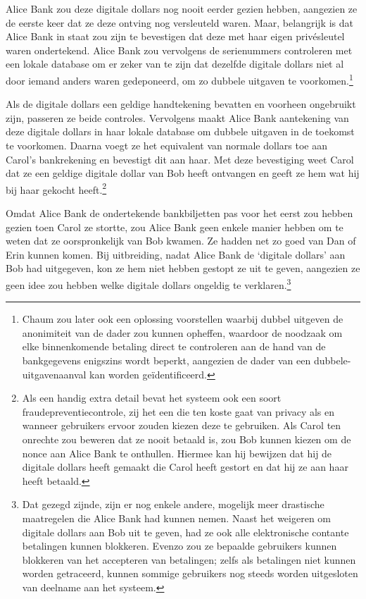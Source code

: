 \documentclass[
  a5paper,
  smalldemyvopaper,11pt,twoside,onecolumn,openright,extrafontsizes]{memoir}
\begin{document}
Alice Bank zou deze digitale dollars nog nooit eerder gezien hebben,
aangezien ze de eerste keer dat ze deze ontving nog versleuteld waren.
Maar, belangrijk is dat Alice Bank in staat zou zijn te bevestigen dat
deze met haar eigen privésleutel waren ondertekend. Alice Bank zou
vervolgens de serienummers controleren met een lokale database om er
zeker van te zijn dat dezelfde digitale dollars niet al door iemand
anders waren gedeponeerd, om zo dubbele uitgaven te
voorkomen.\footnote{Chaum zou later ook een oplossing voorstellen
  waarbij dubbel uitgeven de anonimiteit van de dader zou kunnen
  opheffen, waardoor de noodzaak om elke binnenkomende betaling direct
  te controleren aan de hand van de bankgegevens enigszins wordt
  beperkt, aangezien de dader van een dubbele-uitgavenaanval kan worden
  geïdentificeerd.}

Als de digitale dollars een geldige handtekening bevatten en voorheen
ongebruikt zijn, passeren ze beide controles. Vervolgens maakt Alice
Bank aantekening van deze digitale dollars in haar lokale database om
dubbele uitgaven in de toekomst te voorkomen. Daarna voegt ze het
equivalent van normale dollars toe aan Carol's bankrekening en bevestigt
dit aan haar. Met deze bevestiging weet Carol dat ze een geldige
digitale dollar van Bob heeft ontvangen en geeft ze hem wat hij bij haar
gekocht heeft.\footnote{Als een handig extra detail bevat het systeem
  ook een soort fraudepreventiecontrole, zij het een die ten koste gaat
  van privacy als en wanneer gebruikers ervoor zouden kiezen deze te
  gebruiken. Als Carol ten onrechte zou beweren dat ze nooit betaald is,
  zou Bob kunnen kiezen om de nonce aan Alice Bank te onthullen. Hiermee
  kan hij bewijzen dat hij de digitale dollars heeft gemaakt die Carol
  heeft gestort en dat hij ze aan haar heeft betaald.}

Omdat Alice Bank de ondertekende bankbiljetten pas voor het eerst zou
hebben gezien toen Carol ze stortte, zou Alice Bank geen enkele manier
hebben om te weten dat ze oorspronkelijk van Bob kwamen. Ze hadden net
zo goed van Dan of Erin kunnen komen. Bij uitbreiding, nadat Alice Bank
de `digitale dollars' aan Bob had uitgegeven, kon ze hem niet hebben
gestopt ze uit te geven, aangezien ze geen idee zou hebben welke
digitale dollars ongeldig te verklaren.\footnote{Dat gezegd zijnde, zijn
  er nog enkele andere, mogelijk meer drastische maatregelen die Alice
  Bank had kunnen nemen. Naast het weigeren om digitale dollars aan Bob
  uit te geven, had ze ook alle elektronische contante betalingen kunnen
  blokkeren. Evenzo zou ze bepaalde gebruikers kunnen blokkeren van het
  accepteren van betalingen; zelfs als betalingen niet kunnen worden
  getraceerd, kunnen sommige gebruikers nog steeds worden uitgesloten
  van deelname aan het systeem.}
\end{document}

